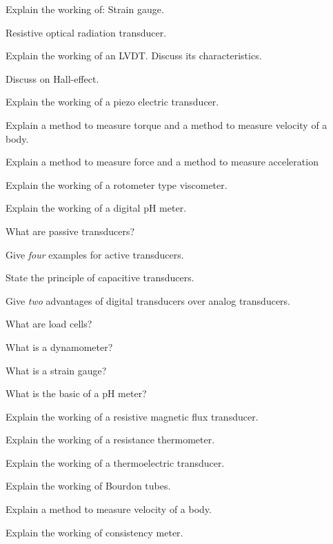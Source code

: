 \item Explain the working of:
\iitem Strain gauge.
\item Resistive optical radiation transducer. \ene
\ene

\item \iitem Explain the working of an LVDT. Discuss its
  characteristics.
\Or
\item \iitem Discuss on Hall-effect.
\item Explain the working of a piezo electric transducer. \ene
\ene

\item \iitem Explain a method to measure torque and a method to measure
  velocity of a body.
\Or
\item Explain a method to measure force and a method to measure
  acceleration
\ene

\item \iitem Explain the working of a rotometer type viscometer.
\Or
\item Explain the working of a digital pH meter.
\ene

\markC
\ene

\newpage

\sub{\subj}
\maxtime

\partA

\iitem What are passive transducers?
\item Give \emph{four} examples for active transducers.
\item State the principle of capacitive transducers.
\item Give \emph{two} advantages of digital transducers over analog 
  transducers.
\item What are load cells?
\item What is a dynamometer?
\item What is a strain gauge?
\item What is the basic of a pH meter?

\markA
\partB

\item Explain the working of a  resistive magnetic flux transducer.
\item Explain the working of a resistance thermometer.
\item Explain the working of a thermoelectric transducer.
\item Explain the working of Bourdon tubes.
\item Explain a method to measure velocity of a body.
\item Explain the working of consistency meter.


